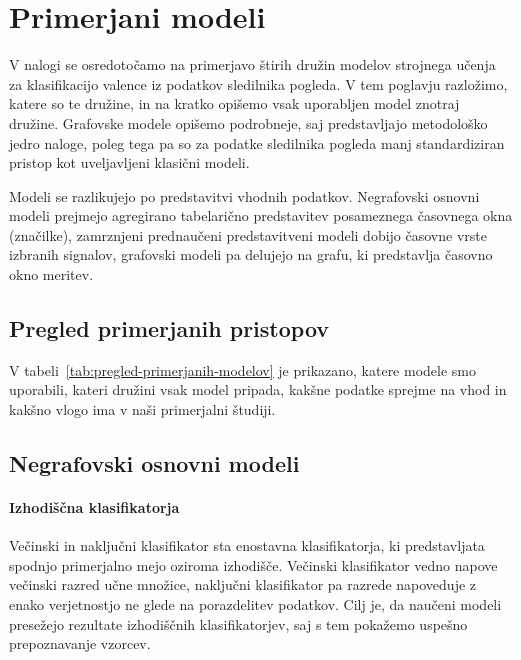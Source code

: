 \chapter{Primerjani modeli}
\label{sec:modeli}

V nalogi se osredotočamo na primerjavo štirih družin modelov strojnega učenja za klasifikacijo valence iz podatkov sledilnika pogleda.
V tem poglavju razložimo, katere so te družine, in na kratko opišemo vsak uporabljen model znotraj družine.
Grafovske modele opišemo podrobneje, saj predstavljajo metodološko jedro naloge, poleg tega pa so za podatke sledilnika pogleda manj standardiziran pristop kot uveljavljeni klasični modeli.

Modeli se razlikujejo po predstavitvi vhodnih podatkov.
Negrafovski osnovni modeli prejmejo agregirano tabelarično predstavitev posameznega časovnega okna (značilke), zamrznjeni prednaučeni predstavitveni modeli dobijo časovne vrste izbranih signalov, grafovski modeli pa delujejo na grafu, ki predstavlja časovno okno meritev.

\section{Pregled primerjanih pristopov}
\label{subsec:pregled-primerjanih-pristopov}

V tabeli~\ref{tab:pregled-primerjanih-modelov} je prikazano, katere modele smo uporabili, kateri družini vsak model pripada, kakšne podatke sprejme na vhod in kakšno vlogo ima v naši primerjalni študiji.
\newpage



\section{Negrafovski osnovni modeli}
\label{subsec:negrafovski-osnovni-modeli}

\subsubsection*{Izhodiščna klasifikatorja}
\label{subsec:izhodiscna-klasifikatorja}

Večinski in naključni klasifikator sta enostavna klasifikatorja, ki predstavljata spodnjo primerjalno mejo oziroma izhodišče.
Večinski klasifikator vedno napove večinski razred učne množice, naključni klasifikator pa razrede napoveduje z enako verjetnostjo ne glede na porazdelitev podatkov.
Cilj je, da naučeni modeli presežejo rezultate izhodiščnih klasifikatorjev, saj s tem pokažemo uspešno prepoznavanje vzorcev.

